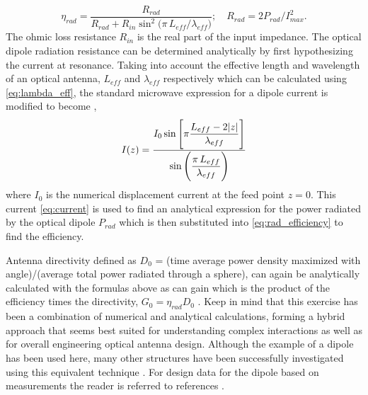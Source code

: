 \documentclass[11pt]{article}
\begin{document}
%
\begin{equation}
  \eta_{rad} = \frac{R_{rad}}{R_{rad} + R_{in} \sin^2(\pi \, L_{eff}/{\lambda _{eff})}}; \quad  R_{rad} = 2 P_{rad}/I_{max}^2.
  \label{eq:rad_efficiency}
\end{equation}
%
The ohmic loss resistance $R_{in}$ is the real part of the input impedance. The optical dipole radiation resistance can be determined analytically by first hypothesizing the current at resonance. Taking into account the effective length and wavelength of an optical antenna, $L_{eff}$ and $\lambda_{eff}$  respectively which can be calculated using \eqref{eq:lambda_eff}, the standard microwave expression for a dipole current is modified to become \cite{Alu2007},
%
\begin{equation}
  I(z) = \frac{\displaystyle I_0 \sin \left [\pi \frac{L_{eff} - 2|z|}{\lambda _{eff}}\right]}{\displaystyle \sin \left( \frac {\pi \, L_{eff}}{\lambda_{eff}} \right)}
  \label{eq:current}
\end{equation}
%
where $I_0$ is the numerical displacement current at the feed point $z = 0$. This current \eqref{eq:current} is used to find an analytical expression for the power radiated by the optical dipole $P_{rad}$ which is then substituted into \eqref{eq:rad_efficiency} to find the efficiency.

Antenna directivity defined as $D_0$ = (time average power density maximized with angle)/(average total power radiated through a sphere), can again be analytically calculated with the formulas above as can gain which is the product of the efficiency times the directivity, $G_0 = \eta_{rad} D_0$ . Keep in mind that this exercise has been a combination of numerical and analytical calculations, forming a hybrid approach that seems best suited for understanding complex interactions as well as for overall engineering optical antenna design.  Although the example of a dipole has been used here, many other structures have been successfully investigated using this equivalent technique \cite{Zhao2011,9781107014145}. For design data for the dipole based on measurements the reader is referred to references \cite{Schuck2005,Fischer2008,Muskens2007}.
\end{document}

